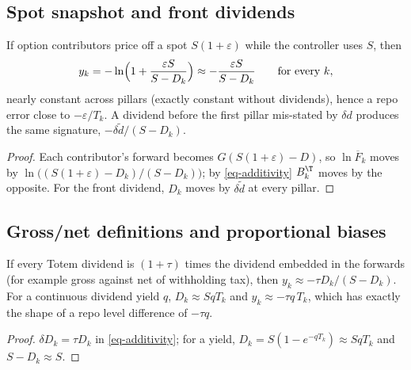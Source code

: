 \subsection{Spot snapshot and front dividends}
\begin{proposition}\label{prop-spot}
If option contributors price off a spot $S(1+\varepsilon)$ while the controller uses $S$, then
\begin{equation}\label{eq-spot}
y_k=-\ln\Bigl(1+\frac{\varepsilon S}{S-D_k}\Bigr)\approx-\frac{\varepsilon S}{S-D_k}\qquad\text{for every }k,
\end{equation}
nearly constant across pillars (exactly constant without dividends), hence a repo error close to $-\varepsilon/T_k$. A
dividend before the first pillar mis-stated by $\delta d$ produces the same signature, $-\delta\tilde d/(S-D_k)$.
\end{proposition}
\begin{proof}
Each contributor's forward becomes $G(S(1+\varepsilon)-D)$, so $\ln\overline{F}_k$ moves by
$\ln\bigl((S(1+\varepsilon)-D_k)/(S-D_k)\bigr)$; by \cref{eq-additivity} $B^\T_k$ moves by the opposite. For the front
dividend, $D_k$ moves by $\delta\tilde d$ at every pillar.
\end{proof}

\subsection{Gross/net definitions and proportional biases}
\begin{proposition}\label{prop-gross}
If every Totem dividend is $(1+\tau)$ times the dividend embedded in the forwards (for example gross against net of
withholding tax), then $y_k\approx-\tau D_k/(S-D_k)$. For a continuous dividend yield $q$, $D_k\approx SqT_k$ and
$y_k\approx-\tau q\,T_k$, which has exactly the shape of a repo level difference of $-\tau q$.
\end{proposition}
\begin{proof}
$\delta D_k=\tau D_k$ in \cref{eq-additivity}; for a yield, $D_k=S(1-e^{-qT_k})\approx SqT_k$ and $S-D_k\approx S$.
\end{proof}


